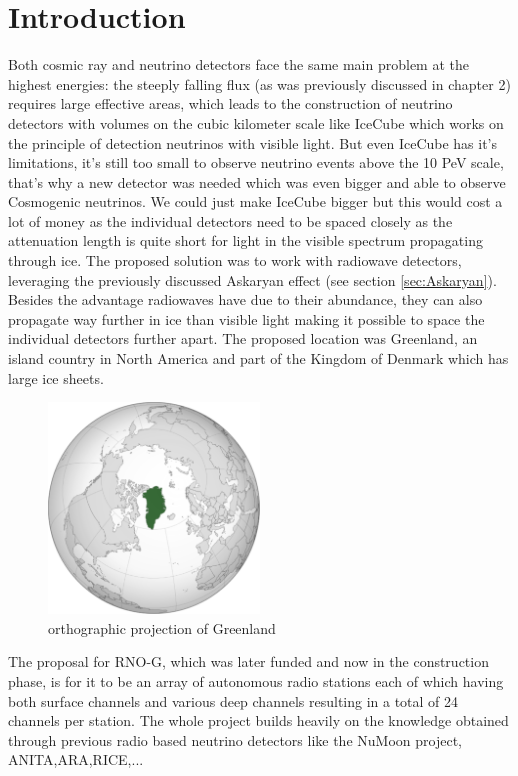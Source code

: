 \documentclass[11pt,a4paper,faculty=we,language=en,doctype=report]{cls/ugent-doc}
\begin{document}
\section{Introduction}
Both cosmic ray and neutrino detectors face the same main problem at the
highest energies: the steeply falling flux (as was previously discussed in
chapter 2) requires large effective areas, which leads to the construction of
neutrino detectors with volumes on the cubic kilometer scale like
IceCube\cite{IceCubeTechnical} which works on the principle of detection
neutrinos with visible light.  But even IceCube has it's limitations, it's
still too small to observe neutrino events above the 10 PeV
scale\cite{IceCubeGen2}, that's why a new detector was needed which was even
bigger and able to observe Cosmogenic neutrinos.  We could just make IceCube
bigger but this would cost a lot of money as the individual detectors need to
be spaced closely as the attenuation length is quite short for light in the visible spectrum
propagating through ice.  The proposed solution was to work with radiowave detectors,
leveraging the previously discussed Askaryan effect (see section
\ref{sec:Askaryan}).  Besides the advantage radiowaves have due to their abundance, they can also
propagate way further in ice than visible light making it possible to space the
individual detectors further apart. The proposed location was Greenland, an
island country in North America and part of the Kingdom of Denmark which has
large ice sheets.
\begin{figure}
  \centering
  \includegraphics[width=0.5\textwidth]{figures/GreenlandOP.pdf}
  \caption{orthographic projection of Greenland}
  \label{fig:GreenlandOP}
\end{figure}
The proposal for RNO-G, which was later funded and now in the construction
phase, is for it to be an array of autonomous radio stations each of which having both
surface channels and various deep channels resulting in a total of 24 channels
per station. The whole project builds heavily on the knowledge obtained through
previous radio based neutrino detectors like the NuMoon\cite{numoon} project,
ANITA\cite{ANITA},ARA\cite{ARA},RICE\cite{RICE},...
\end{document}
